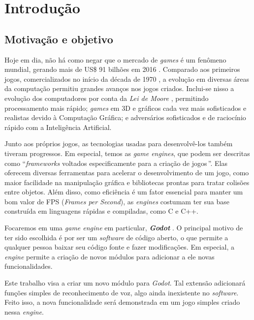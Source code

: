\chapter{Introdução}
\label{cap:introduction}


\section{Motivação e objetivo}

Hoje em dia, não há como negar que o mercado de \textit{games} é um fenômeno mundial, gerando mais de US\$ 91 bilhões em 2016 \citep{gameMarket:16}. Comparado aos primeiros jogos, comercializados no início da década de 1970 \citep{gameMarketOrigin}, a evolução em diversas áreas da computação permitiu grandes avanços nos jogos criados. Inclui-se nisso a evolução dos computadores por conta da \textit{Lei de Moore} \citep{moore}, permitindo processamento mais rápido; \textit{games} em 3D e gráficos cada vez mais sofisticados e realistas devido à Computação Gráfica; e adversários sofisticados e de raciocínio rápido com a Inteligência Artificial.

Junto aos próprios jogos, as tecnologias usadas para desenvolvê-los também tiveram progressos. Em especial, temos as \emph{game engines}, que podem ser descritas como \textquotedblleft \textit{frameworks} voltados especificamente para a criação de jogos\,\textquotedblright\:\citep{gameEngine:13}. Elas oferecem diversas ferramentas para acelerar o desenvolvimento de um jogo, como maior facilidade na manipulação gráfica e bibliotecas prontas para tratar colisões entre objetos. Além disso, como eficiência é um fator essencial para manter um bom valor de FPS (\textit{Frames per Second}), as \textit{engines} costumam ter sua base construída em linguagens rápidas e compiladas, como C e C++.

Focaremos em uma \textit{game engine} em particular, \textbf{\emph{Godot}} \citep{godot}. O principal motivo de ter sido escolhida é por ser um \textit{software} de código aberto, o que permite a qualquer pessoa baixar seu código fonte e fazer modificações. Em especial, a \textit{engine} permite a criação de novos módulos para adicionar a ele novas funcionalidades.

Este trabalho visa a criar um novo módulo para \textit{Godot}. Tal extensão adicionará funções simples de reconhecimento de voz, algo ainda inexistente no \textit{software}. Feito isso, a nova funcionalidade será demonstrada em um jogo simples criado nessa \textit{engine}.

